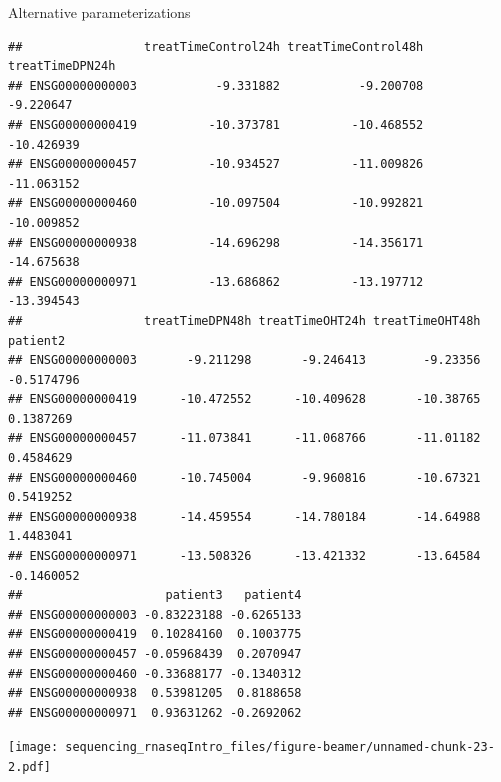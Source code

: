 \documentclass[ignorenonframetext,]{beamer}
\newenvironment{Shaded}{\begin{snugshade}}{\end{snugshade}}
\newcommand{\CommentTok}[1]{\textcolor[rgb]{0.56,0.35,0.01}{\textit{#1}}}
\newcommand{\KeywordTok}[1]{\textcolor[rgb]{0.13,0.29,0.53}{\textbf{#1}}}
\newcommand{\NormalTok}[1]{#1}
\newcommand{\OperatorTok}[1]{\textcolor[rgb]{0.81,0.36,0.00}{\textbf{#1}}}
\newcommand{\StringTok}[1]{\textcolor[rgb]{0.31,0.60,0.02}{#1}}
\begin{document}
\begin{frame}[fragile]{Alternative parameterizations}
\begin{verbatim}
##                 treatTimeControl24h treatTimeControl48h treatTimeDPN24h
## ENSG00000000003           -9.331882           -9.200708       -9.220647
## ENSG00000000419          -10.373781          -10.468552      -10.426939
## ENSG00000000457          -10.934527          -11.009826      -11.063152
## ENSG00000000460          -10.097504          -10.992821      -10.009852
## ENSG00000000938          -14.696298          -14.356171      -14.675638
## ENSG00000000971          -13.686862          -13.197712      -13.394543
##                 treatTimeDPN48h treatTimeOHT24h treatTimeOHT48h   patient2
## ENSG00000000003       -9.211298       -9.246413        -9.23356 -0.5174796
## ENSG00000000419      -10.472552      -10.409628       -10.38765  0.1387269
## ENSG00000000457      -11.073841      -11.068766       -11.01182  0.4584629
## ENSG00000000460      -10.745004       -9.960816       -10.67321  0.5419252
## ENSG00000000938      -14.459554      -14.780184       -14.64988  1.4483041
## ENSG00000000971      -13.508326      -13.421332       -13.64584 -0.1460052
##                    patient3   patient4
## ENSG00000000003 -0.83223188 -0.6265133
## ENSG00000000419  0.10284160  0.1003775
## ENSG00000000457 -0.05968439  0.2070947
## ENSG00000000460 -0.33688177 -0.1340312
## ENSG00000000938  0.53981205  0.8188658
## ENSG00000000971  0.93631262 -0.2692062
\end{verbatim}

\begin{Shaded}
\end{Shaded}

\texttt{[image: sequencing\_rnaseqIntro\_files/figure-beamer/unnamed-chunk-23-2.pdf]}


\end{frame}
\end{document}
